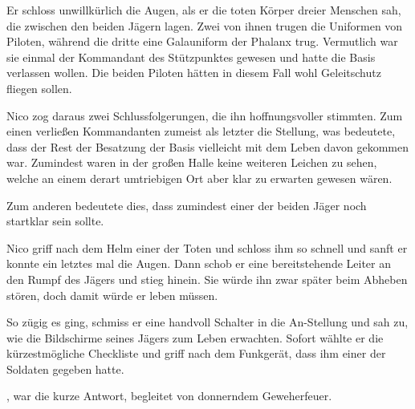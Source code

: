 \par

Er schloss unwillkürlich die Augen, als er die toten Körper dreier Menschen sah, die zwischen den beiden Jägern lagen. Zwei von ihnen trugen die Uniformen von Piloten, während die dritte eine Galauniform der Phalanx trug. Vermutlich war sie einmal der Kommandant des Stützpunktes gewesen und hatte die Basis verlassen wollen. Die beiden Piloten hätten in diesem Fall wohl Geleitschutz fliegen sollen.

\par

Nico zog daraus zwei Schlussfolgerungen, die ihn hoffnungsvoller stimmten. Zum einen verließen Kommandanten zumeist als letzter die Stellung, was bedeutete, dass der Rest der Besatzung der Basis vielleicht mit dem Leben davon gekommen war. Zumindest waren in der großen Halle keine weiteren Leichen zu sehen, welche an einem derart umtriebigen Ort aber klar zu erwarten gewesen wären.

\par

Zum anderen bedeutete dies, dass zumindest einer der beiden Jäger noch startklar sein sollte.

\par

Nico griff nach dem Helm einer der Toten und schloss ihm so schnell und sanft er konnte ein letztes mal die Augen. Dann schob er eine bereitstehende Leiter an den Rumpf des Jägers und stieg hinein. Sie würde ihn zwar später beim Abheben stören, doch damit würde er leben müssen.

\par

So zügig es ging, schmiss er eine handvoll Schalter in die An-Stellung und sah zu, wie die Bildschirme seines Jägers zum Leben erwachten. Sofort wählte er die kürzestmögliche Checkliste und griff nach dem Funkgerät, dass ihm einer der Soldaten gegeben hatte.

\par


\par

, war die kurze Antwort, begleitet von donnerndem Geweherfeuer.

\par


